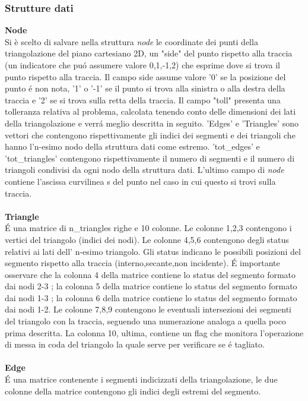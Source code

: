 \documentclass[11pt, a4paper]{article}
\begin{document}
\subsubsection{\textbf{Strutture dati}}
\textbf{Node}\\
Si \`e scelto di salvare nella struttura \textit{node} le coordinate dei punti della triangolazione del piano cartesiano 2D, un "side" del punto rispetto alla traccia (un indicatore che pu\'o assumere valore 0,1,-1,2) che esprime dove si trova il punto rispetto alla traccia. Il campo side assume valore '0' se la posizione del punto \'e non nota, '1' o '-1' se il punto si trova alla sinistra o alla destra della traccia e '2' se si trova sulla retta della traccia. Il campo "toll" presenta una tolleranza relativa al problema, calcolata tenendo conto delle dimensioni dei lati della triangolazione e verr\'a meglio descritta in seguito. 'Edges' e 'Triangles' sono vettori che contengono rispettivamente gli indici dei segmenti e dei triangoli che hanno l'n-esimo nodo della struttura dati come estremo. 'tot\_edges' e 'tot\_triangles' contengono rispettivamente il numero di segmenti e il numero di triangoli condivisi da ogni nodo della struttura dati. L'ultimo campo di \textit{node} contiene l'ascissa curvilinea s del punto nel caso in cui questo si trovi sulla traccia.\\\\
\textbf{Triangle}\\
 \'E una matrice di {n\_triangles} righe e 10 colonne. Le colonne 1,2,3 contengono i vertici del triangolo (indici dei nodi). Le colonne 4,5,6 contengono degli status relativi ai lati dell' n-esimo triangolo. Gli status indicano le possibili posizioni del segmento rispetto alla traccia (interno,secante,non incidente). \'E importante osservare che la colonna 4 della matrice contiene lo status del segmento formato dai nodi 2-3 ; la colonna 5 della matrice contiene lo status del segmento formato dai nodi 1-3 ; la colonna 6 della matrice contiene lo status del segmento formato dai nodi 1-2. Le colonne 7,8,9 contengono le eventuali intersezioni dei segmenti del triangolo con la traccia, seguendo una numerazione analoga a quella poco prima descritta. La colonna 10, ultima, contiene un flag che monitora l'operazione di messa in coda del triangolo la quale serve per verificare se \'e tagliato.\\\\
\textbf{Edge}\\
\'E una matrice contenente i segmenti indicizzati della triangolazione, le due colonne della matrice contengono gli indici degli estremi del segmento.\\\\
\end{document}
